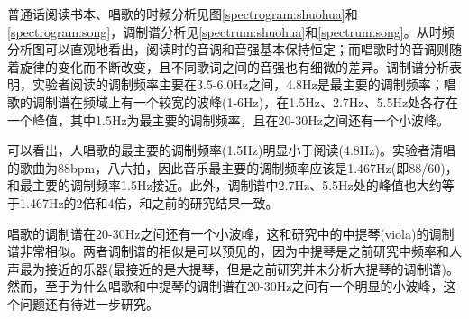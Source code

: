 \documentclass[jou,12pt,floatsintext]{apa7} %
\begin{document}
普通话阅读书本、唱歌的时频分析见图\ref{spectrogram:shuohua}和\ref{spectrogram:song}，调制谱分析见\ref{spectrum:shuohua}和\ref{spectrum:song}。从时频分析图可以直观地看出，阅读时的音调和音强基本保持恒定；而唱歌时的音调则随着旋律的变化而不断改变，且不同歌词之间的音强也有细微的差异。调制谱分析表明，实验者阅读的调制频率主要在3.5-6.0Hz之间，4.8Hz是最主要的调制频率；唱歌的调制谱在频域上有一个较宽的波峰(1-6Hz)，在1.5Hz、2.7Hz、5.5Hz处各存在一个峰值，其中1.5Hz为最主要的调制频率，且在20-30Hz之间还有一个小波峰。

可以看出，人唱歌的最主要的调制频率(1.5Hz)明显小于阅读(4.8Hz)。实验者清唱的歌曲为88bpm，八六拍，因此音乐最主要的调制频率应该是1.467Hz(即88/60)，和最主要的调制频率1.5Hz接近。此外，调制谱中2.7Hz、5.5Hz处的峰值也大约等于1.467Hz的2倍和4倍，和之前的研究结果一致\parencite{ding2017temporal}。

唱歌的调制谱在20-30Hz之间还有一个小波峰，这和\textcite{ding2017temporal}研究中的中提琴(viola)的调制谱非常相似。两者调制谱的相似是可以预见的，因为中提琴是之前研究中频率和人声最为接近的乐器(最接近的是大提琴，但是之前研究并未分析大提琴的调制谱)。然而，至于为什么唱歌和中提琴的调制谱在20-30Hz之间有一个明显的小波峰，这个问题还有待进一步研究。
\end{document}
